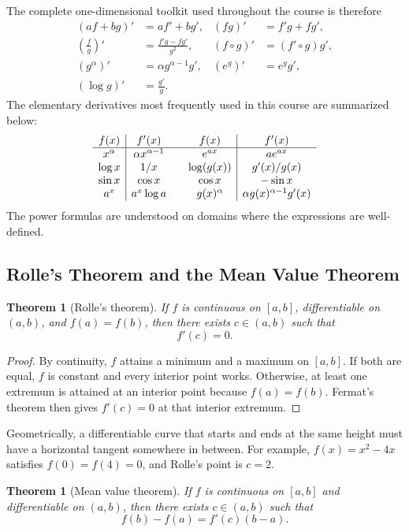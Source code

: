 \documentclass[11pt]{article}
\theoremstyle{definition}
\theoremstyle{plain}
\newtheorem{theorem}[definition]{Theorem}
\theoremstyle{remark}
\begin{document}
The complete one-dimensional toolkit used throughout the course is therefore
\[
\boxed{
\begin{aligned}
(af+bg)'&=af'+bg',
& (fg)'&=f'g+fg',\\
\left(\frac fg\right)'&=\frac{f'g-fg'}{g^2},
& (f\circ g)'&=(f'\circ g)g',\\
(g^\alpha)'&=\alpha g^{\alpha-1}g',
& (e^g)'&=e^g g',\\
(\log g)'&=\frac{g'}{g}.
\end{aligned}}
\]
The elementary derivatives most frequently used in this course are summarized
below:
\[
\begin{array}{c|c@{\qquad}c|c}
f(x)&f'(x)&f(x)&f'(x)\\ \hline
x^\alpha&\alpha x^{\alpha-1}&e^{ax}&ae^{ax}\\
\log x&1/x&\log(g(x))&g'(x)/g(x)\\
\sin x&\cos x&\cos x&-\sin x\\
a^x&a^x\log a&g(x)^\alpha&\alpha g(x)^{\alpha-1}g'(x)
\end{array}
\]
The power formulas are understood on domains where the expressions are
well-defined.

\subsection{Rolle's Theorem and the Mean Value Theorem}

\begin{theorem}[Rolle's theorem]
If $f$ is continuous on $[a,b]$, differentiable on $(a,b)$, and
$f(a)=f(b)$, then there exists $c\in(a,b)$ such that
\[
f'(c)=0.
\]
\end{theorem}

\begin{proof}
By continuity, $f$ attains a minimum and a maximum on $[a,b]$. If both are
equal, $f$ is constant and every interior point works. Otherwise, at least one
extremum is attained at an interior point because $f(a)=f(b)$. Fermat's
theorem then gives $f'(c)=0$ at that interior extremum.
\end{proof}

Geometrically, a differentiable curve that starts and ends at the same height
must have a horizontal tangent somewhere in between. For example,
$f(x)=x^2-4x$ satisfies $f(0)=f(4)=0$, and Rolle's point is $c=2$.

\begin{theorem}[Mean value theorem]
If $f$ is continuous on $[a,b]$ and differentiable on $(a,b)$, then there
exists $c\in(a,b)$ such that
\[
f(b)-f(a)=f'(c)(b-a).
\]
\end{theorem}
\end{document}
